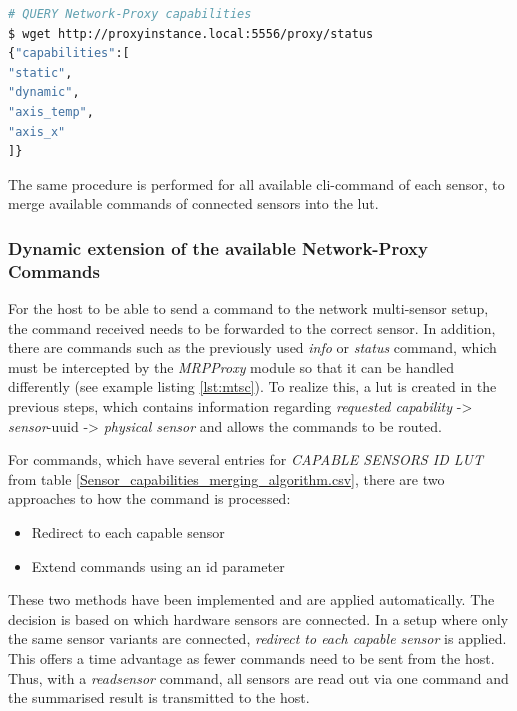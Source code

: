 \begin{lstlisting}[language=bash, caption={MRPProxy REST capabilities query result after executing the merging algorithm}, label=lst:mtsc]
# QUERY Network-Proxy capabilities
$ wget http://proxyinstance.local:5556/proxy/status
{"capabilities":[
"static",
"dynamic",
"axis_temp",
"axis_x"
]}
\end{lstlisting}

The same procedure is performed for all available \gls{cli}-command of
each sensor, to merge available commands of connected sensors into the
\gls{lut}.

\hypertarget{dynamic-extension-of-the-available-network-proxy-commands}{%
\subsubsection{Dynamic extension of the available Network-Proxy
Commands}\label{dynamic-extension-of-the-available-network-proxy-commands}}

For the host to be able to send a command to the network multi-sensor
setup, the command received needs to be forwarded to the correct sensor.
In addition, there are commands such as the previously used \emph{info}
or \emph{status} command, which must be intercepted by the
\emph{MRPProxy} module so that it can be handled differently (see
example listing \ref{lst:mtsc}). To realize this, a \gls{lut} is created
in the previous steps, which contains information regarding
\emph{requested capability} -\textgreater{} \emph{sensor}-\gls{uuid}
-\textgreater{} \emph{physical sensor} and allows the commands to be
routed.

For commands, which have several entries for \emph{CAPABLE SENSORS ID
LUT} from table \ref{Sensor_capabilities_merging_algorithm.csv}, there
are two approaches to how the command is processed:

\begin{itemize}
\tightlist
\item
  Redirect to each capable sensor
\item
  Extend commands using an id parameter
\end{itemize}

These two methods have been implemented and are applied automatically.
The decision is based on which hardware sensors are connected. In a
setup where only the same sensor variants are connected, \emph{redirect
to each capable sensor} is applied. This offers a time advantage as
fewer commands need to be sent from the host. Thus, with a
\emph{readsensor} command, all sensors are read out via one command and
the summarised result is transmitted to the host.

